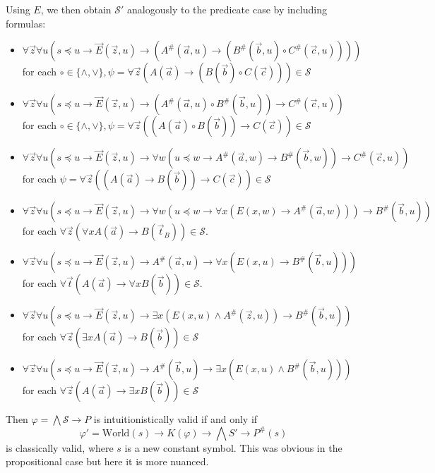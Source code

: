 \documentclass[a4paper,11pt]{report}
\theoremstyle{definition}
\theoremstyle{definition}
\theoremstyle{definition}
\theoremstyle{definition}
\theoremstyle{definition}
\theoremstyle{definition}
\theoremstyle{definition}
\begin{document}
	Using $E$, we then obtain $\mathcal S'$ analogously to the predicate case by including formulas:
	
	\begin{itemize}
		\item $\forall \vec z\forall u(s\preceq u\to \vec E(\vec z, u)\to (A^\#(\vec a, u)\to (B^\#(\vec b, u)\circ C^\#(\vec c, u))))$\\for each $\circ\in\{\wedge, \vee\}, \psi = \forall \vec z(A(\vec a)\to (B(\vec b)\circ C(\vec c)))\in\mathcal S$
		\item $\forall \vec z\forall u(s\preceq u\to\vec E(\vec z, u)\to (A^\#(\vec a, u)\circ B^\#(\vec b, u))\to C^\#(\vec c, u))$\\for each $\circ\in\{\wedge, \vee\}, \psi = \forall \vec z((A(\vec a)\circ B(\vec b))\to C(\vec c))\in\mathcal S$
		\item $\forall \vec z\forall u(s\preceq u\to\vec E(\vec z, u)\to\forall w(u\preceq w\to A^\#(\vec a, w)\to B^\#(\vec b, w))\to C^\#(\vec c, u))$\\ for each $\psi = \forall \vec z((A(\vec a)\to B(\vec b))\to C(\vec c))\in\mathcal S$
		\item  $\forall \vec z\forall u(s\preceq u\to\vec E(\vec z, u)\to \forall w(u\preceq w\to \forall x(E(x, w)\to A^\#(\vec a, w)))\to B^\#(\vec b, u))$\\for each $\forall \vec z(\forall xA(\vec a)\to B(\vec t_B))\in\mathcal S$.
		\item $\forall \vec z\forall u(s\preceq u\to\vec E(\vec z, u)\to A^\#(\vec a, u)\to \forall x(E(x, u)\to B^\#(\vec b, u)))$\\for each $\forall \vec t(A(\vec a)\to \forall xB(\vec b))\in\mathcal S$.
		\item $\forall \vec z\forall u(s\preceq u\to\vec E(\vec z, u)\to \exists x(E(x, u)\wedge A^\#(\vec z, u))\to B^\#(\vec b, u))$\\for each $\forall \vec z(\exists xA(\vec a)\to B(\vec b))\in\mathcal S$
		\item $\forall \vec z\forall u(s\preceq u\to\vec E(\vec z, u)\to A^\#(\vec b, u)\to \exists x(E(x, u)\wedge B^\#(\vec b, u)))$\\for each $\forall \vec z(A(\vec a)\to \exists xB(\vec b))\in\mathcal S$
	\end{itemize}
	
	Then $\varphi = \bigwedge\mathcal S\to P$ is intuitionistically valid if and only if
	$$\varphi' = \text{World}(s)\to K(\varphi)\to \bigwedge S'\to P^\#(s)$$
	is classically valid, where $s$ is a new constant symbol. This was obvious in the propositional case but here it is more nuanced.
	
\end{document}
